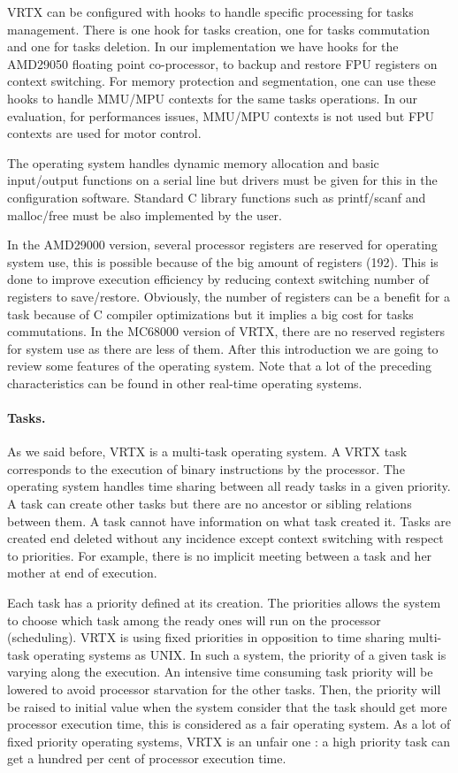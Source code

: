 \documentclass[10pt]{report}
\begin{document}
VRTX can be configured with hooks to handle specific processing for tasks management. There is one hook for tasks creation, one
for tasks commutation and one for tasks deletion. In our implementation we have hooks for the AMD29050 floating point
co-processor, to backup and restore FPU registers on context switching. For memory protection and segmentation, one can use
these hooks to handle MMU/MPU contexts for the same tasks operations. In our evaluation, for performances issues, MMU/MPU
contexts is not used but FPU contexts are used for motor control.

The operating system handles dynamic memory allocation and basic input/output functions on a serial line but drivers must
be given for this in the configuration software. Standard C library functions such as printf/scanf and malloc/free must be
also implemented by the user.

In the AMD29000 version, several processor registers are reserved for operating system use, this is possible because of the big
amount of registers (192). This is done to improve execution efficiency by reducing context switching number of registers
to save/restore. Obviously, the number of registers can be a benefit for a task because of C compiler optimizations but it
implies a big cost for tasks commutations. In the MC68000 version of VRTX, there are no reserved registers for system use as
there are less of them. After this introduction we are going to review some features of the operating system. Note that a lot
of the preceding characteristics can be found in other real-time operating systems.

\paragraph{Tasks.} As we said before, VRTX is a multi-task operating system. A VRTX task corresponds to the execution of binary
instructions by the processor. The operating system handles time sharing between all ready tasks in a given priority. A task can
create other tasks but there are no ancestor or sibling relations between them. A task cannot have information on what task
created it. Tasks are created end deleted without any incidence except context switching with respect to priorities. For example,
there is no implicit meeting between a task and her mother at end of execution.

Each task has a priority defined at its creation. The priorities allows the system to choose which task among the ready ones
will run on the processor (scheduling). VRTX is using fixed priorities in opposition to time sharing multi-task operating
systems as UNIX. In such a system, the priority of a given task is varying along the execution. An intensive time consuming
task priority will be lowered to avoid processor starvation for the other tasks. Then, the priority will be raised to initial
value when the system consider that the task should get more processor execution time, this is considered as a fair operating
system. As a lot of fixed priority operating systems, VRTX is an unfair one : a high priority task can get a hundred per cent
of processor execution time.
\end{document}
